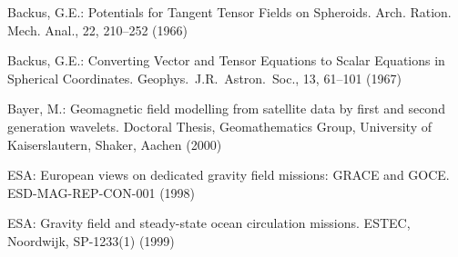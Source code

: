 \begin{thebibliography}{[KLR73]}
%
 Backus, G.E.: Potentials for Tangent Tensor Fields on
Spheroids. Arch. Ration. Mech. Anal., 22, 210--252 (1966)

 Backus, G.E.: Converting Vector and Tensor Equations to Scalar Equations
in Spherical Coordinates. Geophys.\ J.R.\ Astron.\ Soc., 13, 61--101 (1967)

 Bayer, M.: Geomagnetic field modelling from satellite data by
first and second generation wavelets.
Doctoral Thesis, Geomathematics Group, University of Kaisers\-lautern, Shaker, Aachen (2000)

 ESA: European views on dedicated gravity field missions: GRACE and GOCE.
ESD-MAG-REP-CON-001 (1998)

 ESA: Gravity field and steady-state ocean circulation missions.
ESTEC, Noordwijk, SP-1233(1) (1999)

\end{thebibliography}
